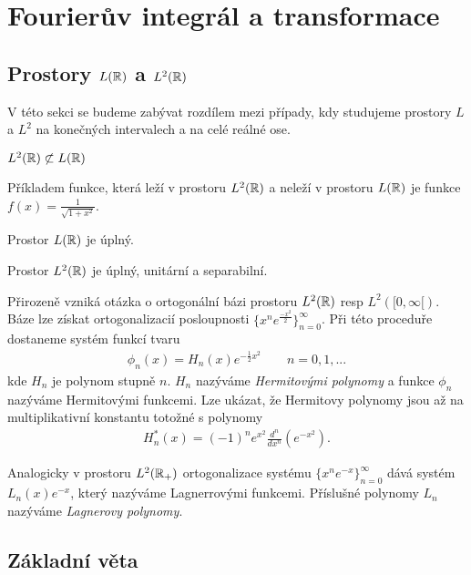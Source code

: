 

\chapter{Fourier\r uv integrál a transformace}
\section{Prostory \texorpdfstring{$L(\mathbb{R})$ a $L^2(\mathbb{R})$}{sss}}
V této sekci se budeme zabývat rozdílem mezi případy, kdy studujeme prostory $L$ a $L^2$ na konečných intervalech a na celé reálné ose.

\begin{tvrz}
$L^2(\mathbb{R}) \not\subset L(\mathbb{R}) $
\end{tvrz}
\begin{priklad}
Příkladem funkce, která leží v prostoru $L^2(\mathbb{R})$ a neleží v prostoru $L(\mathbb{R})$ je funkce $f(x)=\frac{1}{\sqrt{1+x^2}}$.
\end{priklad}


\begin{tvrz}
Prostor $L(\mathbb{R})$ je úplný.
\end{tvrz}

\begin{tvrz}
Prostor $L^2(\mathbb{R})$ je úplný, unitární a separabilní.
\end{tvrz}

Přirozeně vzniká otázka o ortogonální bázi prostoru $L^2(\mathbb{R})$ resp $L^2([0,\infty[)$. 
Báze lze získat ortogonalizacií posloupnosti $\{x^n e^{\frac{-x^2}{2}}\}_{n=0}^{\infty}$. Při této proceduře dostaneme systém funkcí tvaru 
\begin{align}
\phi_n(x)=H_n(x)e^{-\frac{1}{2}x^2} \qquad n=0,1,...
\end{align}
kde $H_n$ je polynom stupně $n$. 
$H_n$ nazýváme \textit{Hermitovými polynomy} a funkce $\phi_n$ nazýváme Hermitovými funkcemi. Lze ukázat, že Hermitovy polynomy jsou až na multiplikativní konstantu totožné s polynomy 
\begin{align}
H^*_n(x)=(-1)^ne^{x^2}\frac{d^n}{dx^n}(e^{-x^2}).
\end{align}

Analogicky v prostoru $L^2(\mathbb{R}_+)$ ortogonalizace systému $\{x^n e^{-x}\}_{n=0}^{\infty}$ dává systém $L_n(x) e^{-x}$, který nazýváme Lagnerrovými funkcemi. Příslušné polynomy $L_n$ nazýváme \textit{Lagnerovy polynomy}.


\section{Základní věta}

